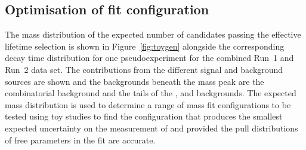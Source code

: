 \subsection{Optimisation of fit configuration}



The mass distribution of the expected number of \bsmumu candidates passing the effective lifetime selection is shown in Figure~\ref{fig:toygen} alongside the corresponding decay time distribution for one pseudoexperiment for the combined Run~1 and Run~2 data set. 
The contributions from the different signal and background sources are shown and the backgrounds beneath the \bs mass peak are the combinatorial background and the tails of the \bhh, \bdmumu and \lambdab backgrounds. The expected mass distribution is used to determine a range of mass fit configurations to be tested using toy studies to find the configuration that produces the smallest expected uncertainty on the measurement of \tmumu and \Gmumu provided the pull distributions of free parameters in the fit are accurate.


